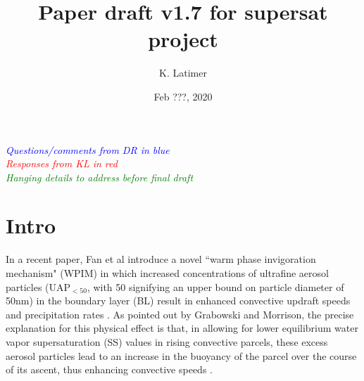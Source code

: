 \documentclass{article}
\title{Paper draft v1.7 for supersat project}
\author{K. Latimer}
\date{Feb ???, 2020}
\newcommand{\drcomm}[1]{\textcolor{blue}{\textit{#1}}}
\newcommand{\klcomm}[1]{\textcolor{red}{\textit{#1}}}
\newcommand{\todo}[1]{\textcolor{green}{\textit{#1}}}
\begin{document}
\maketitle

\noindent\drcomm{Questions/comments from DR in blue} \\
\noindent\klcomm{Responses from KL in red}\\
\noindent\todo{Hanging details to address before final draft}\\

\section{Intro}

In a recent paper, Fan et al introduce a novel ``warm phase invigoration mechanism" (WPIM) in which increased concentrations of ultrafine aerosol particles (UAP$_{<50}$, with 50 signifying an upper bound on particle diameter of 50nm) in the boundary layer (BL) result in enhanced convective updraft speeds and precipitation rates \cite{Fan2018}. As pointed out by Grabowski and Morrison, the precise explanation for this physical effect is that, in allowing for lower equilibrium water vapor supersaturation (SS) values in rising convective parcels, these excess aerosol particles lead to an increase in the buoyancy of the parcel over the course of its ascent, thus enhancing convective speeds \cite{Grabowski2020}.
\end{document}
